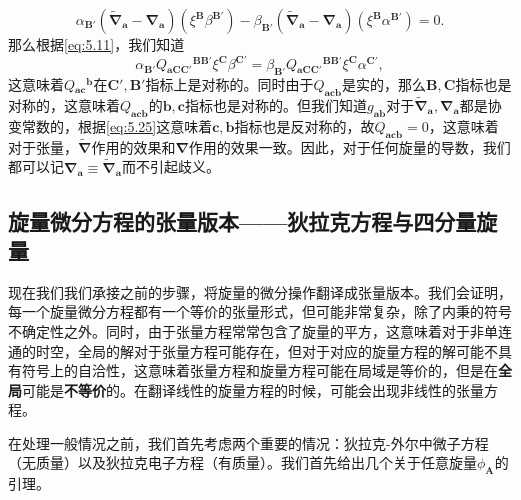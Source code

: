 \begin{equation*}
	\alpha _{\boldsymbol{B} '} (\tilde{\boldsymbol{\nabla }}_{\boldsymbol{a}} -\boldsymbol{\nabla }_{\boldsymbol{a}} )(\xi ^{\boldsymbol{B}} \beta ^{\boldsymbol{B} '} )-\beta _{\boldsymbol{B} '} (\tilde{\boldsymbol{\nabla }}_{\boldsymbol{a}} -\boldsymbol{\nabla }_{\boldsymbol{a}} )(\xi ^{\boldsymbol{B}} \alpha ^{\boldsymbol{B} '} )=0.
\end{equation*}
那么根据\ref{eq:5.11}，我们知道
\begin{equation*}
	\alpha _{\boldsymbol{B} '} Q{_{\boldsymbol{aCC} '}}^{\boldsymbol{BB} '} \xi ^{\boldsymbol{C}} \beta ^{\boldsymbol{C} '} =\beta _{\boldsymbol{B} '} Q{_{\boldsymbol{aCC} '}}^{\boldsymbol{BB} '} \xi ^{\boldsymbol{C}} \alpha ^{\boldsymbol{C} '} ,
\end{equation*}
这意味着$Q{_{\boldsymbol{ac}}}^{\boldsymbol{b}}$在$\boldsymbol{C} ',\boldsymbol{B} '$指标上是对称的。同时由于$Q_{\boldsymbol{acb}}$是实的，那么$\boldsymbol{B} ,\boldsymbol{C}$指标也是对称的，这意味着$Q_{\boldsymbol{acb}}$的$\boldsymbol{b} ,\boldsymbol{c}$指标也是对称的。但我们知道$g_{\boldsymbol{ab}}$对于$\tilde{\boldsymbol{\nabla }}_{\boldsymbol{a}} ,\boldsymbol{\nabla }_{\boldsymbol{a}}$都是协变常数的，根据\ref{eq:5.25}这意味着$\boldsymbol{c} ,\boldsymbol{b}$指标也是反对称的，故$Q_{\boldsymbol{acb}} =0$，这意味着对于张量，$\tilde{\boldsymbol{\nabla }}$作用的效果和$\boldsymbol{\nabla }$作用的效果一致。因此，对于任何旋量的导数，我们都可以记$\boldsymbol{\nabla }_{\boldsymbol{a}} \equiv \tilde{\boldsymbol{\nabla }}_{\boldsymbol{a}}$而不引起歧义。


\subsection{旋量微分方程的张量版本——狄拉克方程与四分量旋量}

现在我们我们承接之前的步骤，将旋量的微分操作翻译成张量版本。我们会证明，每一个旋量微分方程都有一个等价的张量形式，但可能非常复杂，除了内秉的符号不确定性之外。同时，由于张量方程常常包含了旋量的平方，这意味着对于非单连通的时空，全局的解对于张量方程可能存在，但对于对应的旋量方程的解可能不具有符号上的自洽性，这意味着张量方程和旋量方程可能在局域是等价的，但是在\textbf{全局}可能是\textbf{不等价}的。在翻译线性的旋量方程的时候，可能会出现非线性的张量方程。



在处理一般情况之前，我们首先考虑两个重要的情况：狄拉克-外尔中微子方程（无质量）以及狄拉克电子方程（有质量）。我们首先给出几个关于任意旋量$\phi _{\boldsymbol{A}}$的引理。



